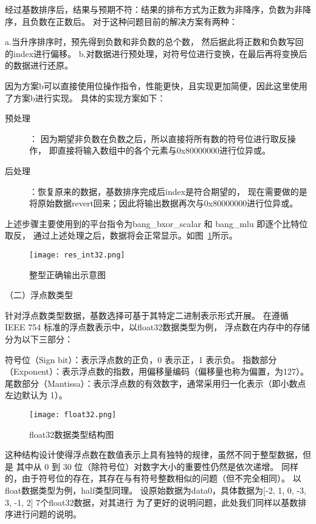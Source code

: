 经过基数排序后，结果与预期不符：结果的排布方式为正数为非降序，负数为非降序，且负数在正数后。
对于这种问题目前的解决方案有两种：

a.当升序排序时，预先得到负数和非负数的总个数，
然后据此将正数和负数写回的index进行偏移。
b.对数据进行预处理，对符号位进行变换，在最后再将变换后的数据进行还原。

因为方案b可以直接使用位操作指令，性能更快，且实现更加简便，因此这里使用了方案b进行实现。
具体的实现方案如下：
\begin{description}
\item[预处理]：
因为期望非负数在负数之后，所以直接将所有数的符号位进行取反操作，
即直接将输入数组中的各个元素与0x80000000进行位异或。

\item[后处理]：恢复原来的数据，基数排序完成后index是符合期望的，
现在需要做的是将原始数据revert回来；因此将输出数据再次与0x80000000进行位异或。
\end{description}

上述步骤主要使用到的平台指令为bang\_bxor\_scalar 和 bang\_mlu
即逐个比特位取反， 通过上述处理之后，数据将会正常显示。如图~\ref{fig:res_int32}所示。
\begin{figure}[ht]
    \centering
    \texttt{[image: res\_int32.png]}
    \caption{整型正确输出示意图}
    \label{fig:res_int32}
\end{figure}




（二）浮点数类型

针对浮点数类型数据，基数选择可基于其特定二进制表示形式开展。
在遵循 IEEE 754 标准的浮点数表示中，以float32数据类型为例，
浮点数在内存中的存储分为以下三部分：

符号位（Sign bit）：表示浮点数的正负，0 表示正，1 表示负。
指数部分（Exponent）：表示浮点数的指数，用偏移量编码（偏移量也称为偏置，为127）。
尾数部分（Mantissa）：表示浮点数的有效数字，通常采用归一化表示（即小数点左边默认为 1）。


\begin{figure}[ht]
    \centering
    \texttt{[image: float32.png]}
    \caption{float32数据类型结构图}
    \label{fig:float32}
\end{figure}
这种结构设计使得浮点数在数值表示上具有独特的规律，虽然不同于整型数据，但是
其中从 0 到 30 位（除符号位）对数字大小的重要性仍然是依次递增。
同样的，由于符号位的存在，其存在与有符号整数相似的问题（但不完全相同）。
以float数据类型为例，half类型同理。
设原始数据为data0，具体数据为[-2, 1, 0,  -3, 3, -1, 2] 7个float32数据，对其进行
为了更好的说明问题，此处我们同样以基数排序进行问题的说明。

